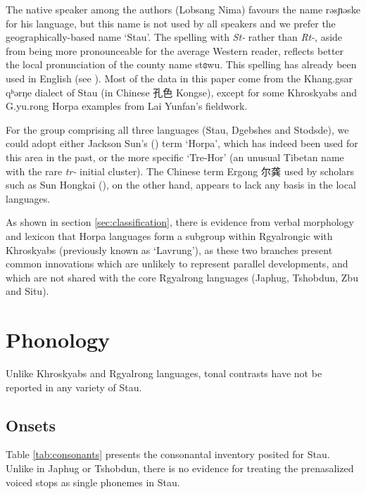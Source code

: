 \documentclass[oneside,a4paper,11pt]{article}
\newcommand{\ipa}[1]{{\phon#1}} %
\newcommand{\zh}[1]{{\cn#1}}
\begin{document}
  The native speaker among the authors (Lobsang Nima) favours the name \ipa{rəsɲəske} for his language, but this name is not used by all speakers and we prefer the geographically-based name  `Stau'. The spelling with \textit{St-} rather than \textit{Rt-}, aside from being more pronounceable for the average Western reader, reflects better the local pronunciation of the county name \ipa{stɞwu}. This spelling has already been used in English (see \citealt{wang70stau}).   Most of the data in this paper come from the Khang.gsar \ipa{qʰərŋe} dialect of Stau (in Chinese \zh{孔色} Kongse), except for some Khroskyabs and G.yu.rong Horpa examples from Lai Yunfan's fieldwork.
  
For the group comprising all three languages (Stau, Dgebshes and Stodsde),  we could adopt either Jackson Sun's 
(\citeyear{jackson00sidaba}) term `Horpa', which has indeed been used for this area in the past, or the more specific `Tre-Hor' (an unusual Tibetan name with the rare \textit{tr-} initial cluster).  The Chinese term Ergong \zh{尔龚} used by scholars such as Sun Hongkai (\citeyear{sun83liujiang}), on the other hand, appears to lack any basis in the local languages.
 
As shown in section \ref{sec:classification}, there is evidence from verbal morphology and lexicon that Horpa languages form a subgroup within Rgyalrongic with Khroskyabs (previously known as `Lavrung'), as these two branches present common innovations which are unlikely to represent parallel developments, and which are not shared with the core Rgyalrong languages (Japhug, Tshobdun, Zbu and Situ).
 
\section{Phonology}
Unlike Khroskyabs and Rgyalrong languages, tonal contrasts have not be reported in any variety of Stau.
 
  \subsection{Onsets}
  Table \ref{tab:consonants} presents the consonantal inventory posited for Stau. Unlike in Japhug or Tshobdun, there is no evidence for treating the prenasalized voiced stops as single phonemes in Stau.
  
\end{document}
